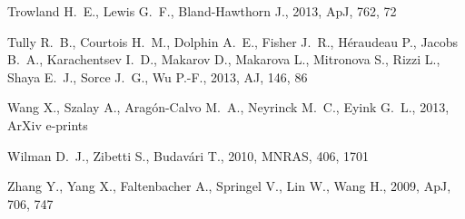 \documentclass[useAMS,usenatbib]{mn2e}
\newcommand{\apj}{ApJ}
\newcommand{\aj}{AJ}
\newcommand{\mnras}{MNRAS}
\begin{document}
\begin{thebibliography}{}
{Trowland} H.~E.,  {Lewis} G.~F.,    {Bland-Hawthorn} J.,  2013, \apj, 762, 72

{Tully} R.~B.,  {Courtois} H.~M.,  {Dolphin} A.~E.,  {Fisher} J.~R.,
  {H{\'e}raudeau} P.,  {Jacobs} B.~A.,  {Karachentsev} I.~D.,  {Makarov} D.,
  {Makarova} L.,  {Mitronova} S.,  {Rizzi} L.,  {Shaya} E.~J.,  {Sorce} J.~G.,
    {Wu} P.-F.,  2013, \aj, 146, 86

{Wang} X.,  {Szalay} A.,  {Arag{\'o}n-Calvo} M.~A.,  {Neyrinck} M.~C.,
  {Eyink} G.~L.,  2013, ArXiv e-prints

{Wilman} D.~J.,  {Zibetti} S.,    {Budav{\'a}ri} T.,  2010, \mnras, 406, 1701

{Zhang} Y.,  {Yang} X.,  {Faltenbacher} A.,  {Springel} V.,  {Lin} W.,
  {Wang} H.,  2009, \apj, 706, 747

\end{thebibliography}
\end{document}
